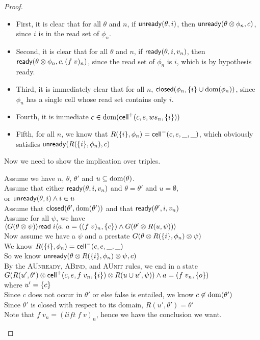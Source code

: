 \begin{proof}
\begin{itemize}
\item First, it is clear that for all $\theta$ and $n$, if $\mathsf{unready}({\theta}, {i})$, then $\mathsf{unready}({\theta \otimes \phi_n}, {c})$, since $i$ is in the read set of $\phi_n$. 
\item Second, it is clear that for all $\theta$ and $n$, if $\mathsf{ready}({\theta}, {i}, {v_n})$, then $\mathsf{ready}({\theta \otimes \phi_n}, {c}, {(f\;v)_n})$, since the read set of $\phi_n$ is $i$, which is by hypothesis ready. 
\item Third, it is immediately clear that for all $n$, $\mathsf{closed}({\phi_n}, {\{{i}\} \cup \mbox{dom}({\phi_n})})$,
since $\phi_n$ has a single cell whose read set contains only $i$. 
\item Fourth, it is immediate $c \in \mbox{dom}({\mathsf{cell}^{+}({c}, {e}, {ws_n}, {\{{i}\}})})$
\item Fifth, for all $n$, we know that $R(\{{i}\}, \phi_n) = \mathsf{cell}^{-}({c}, {e}, {\_}, {\_})$, which obviously satisfies $\mathsf{unready}({R(\{{i}\}, \phi_n)}, {c})$ 

\end{itemize}
Now we need to show the implication over triples. 
\begin{tabbedproof}
\oo Assume we have $n$, $\theta$, $\theta'$ and $u \subseteq \mbox{dom}({\theta})$. \\
\oo Assume that either $\mathsf{ready}({\theta}, {i}, {v_n})$ and $\theta = \theta'$ and $u = \emptyset$,  \\
\oo or $\mathsf{unready}({\theta}, {i}) \land i \in u$ \\
\oo Assume that $\mathsf{closed}({\theta'}, {\mbox{dom}({\theta'})})$ and that $\mathsf{ready}({\theta'}, {i}, {v_n})$ \\
\oo Assume for all $\psi$, we have \\
\ox  $\langle{G(\theta \otimes \psi)}\rangle{\mathsf{read}\;i}\langle{a}.\;{a = ((f\;v)_n, \{{c}\}) 
      \land G(\theta' \otimes R(u,\psi))}\rangle$ \\
\oo Now assume we have a $\psi$ and a prestate $G(\theta \otimes R(\{{i}\}, \phi_n) \otimes \psi)$ \\
\oo We know $R(\{{i}\}, \phi_n) = \mathsf{cell}^{-}({c}, {e}, {\_}, {\_})$ \\
\oo So we know $\mathsf{unready}({\theta \otimes R(\{{i}\}, \phi_n) \otimes \psi}, {c})$ \\
\oo By the \textsc{AUnready}, \textsc{ABind}, and \textsc{AUnit} rules, we end in a state \\
\oo $G(R(u',\theta') \otimes \mathsf{cell}^{+}({c}, {e}, {f\;v_n}, {\{{i}\}}) \otimes R(u \cup u',\psi)) \land a = (f\;v_n, \{{o}\})$ \\
\oo where $u' = \{{c}\}$ \\
\oo Since $c$ does not occur in $\theta'$ or else false is entailed, we know $c \not\in \mbox{dom}({\theta'})$ \\
\oo Since $\theta'$ is closed with respect to its domain, $R(u',\theta') = \theta'$ \\
\oo Note that $f\;v_n = (\mathit{lift}\;f\;v)_n$, hence we have the conclusion we want. \\
\end{tabbedproof}

\end{proof}

